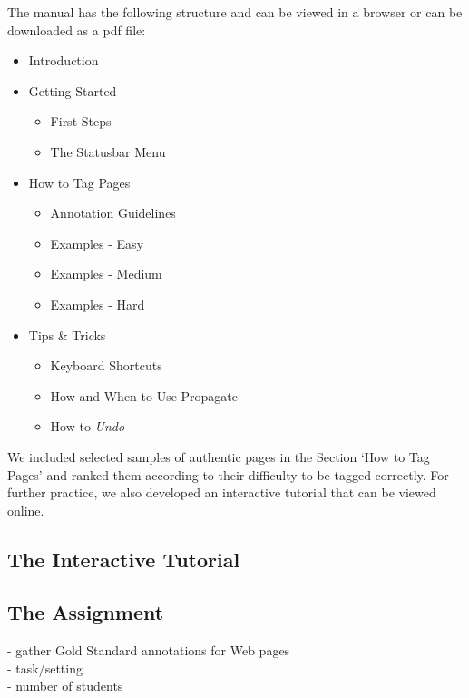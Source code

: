 \documentclass[12pt]{article}
\begin{document}
The manual has the following structure and can be viewed in a browser or can be downloaded as a pdf file\footnotemark[\value{footnote}]:


\begin{itemize}
	\item Introduction
	\item Getting Started
		\begin{itemize}
			\item First Steps
			\item The Statusbar Menu
		\end{itemize}
	\item How to Tag Pages
		\begin{itemize}
			\item Annotation Guidelines
			\item Examples - Easy
			\item Examples - Medium
			\item Examples - Hard
		\end{itemize}
	\item Tips \& Tricks
		\begin{itemize}
			\item Keyboard Shortcuts
			\item How and When to Use Propagate
			\item How to \textit{Undo}
		\end{itemize}
	
\end{itemize}

We included selected samples of authentic pages in the Section `How to Tag Pages' and ranked them according to their difficulty to be tagged correctly. For further practice, we also developed an interactive tutorial that can be viewed online.


\subsection{The Interactive Tutorial}


\subsection{The Assignment}

- gather Gold Standard annotations for Web pages\\
- task/setting\\
- number of students
\end{document}
